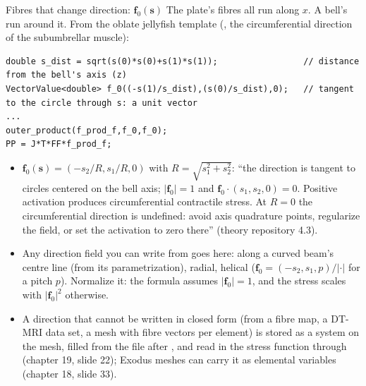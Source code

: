 \documentclass[aspectratio=169,11pt]{beamer}
\begin{document}
\begin{frame}[fragile]{Fibres that change direction: $\mathbf{f}_0(\mathbf{s})$}
\label{fr:fibres}
\footnotesize
The plate's fibres all run along $x$. A bell's run around it. From the oblate jellyfish template (, the circumferential direction of the subumbrellar muscle):
\begin{lstlisting}[style=cpptiny]
double s_dist = sqrt(s(0)*s(0)+s(1)*s(1));                 // distance from the bell's axis (z)
VectorValue<double> f_0((-s(1)/s_dist),(s(0)/s_dist),0);   // tangent to the circle through s: a unit vector
...
outer_product(f_prod_f,f_0,f_0);
PP = J*T*FF*f_prod_f;
\end{lstlisting}
\begin{itemize}
  \item $\mathbf{f}_0(\mathbf{s}) = (-s_2/R, s_1/R, 0)$ with $R = \sqrt{s_1^2 + s_2^2}$: ``the direction is tangent to circles centered on the bell axis; $|\mathbf{f}_0| = 1$ and $\mathbf{f}_0\cdot(s_1, s_2, 0) = 0$. Positive activation produces circumferential contractile stress. At $R = 0$ the circumferential direction is undefined: avoid axis quadrature points, regularize the field, or set the activation to zero there'' (theory repository 4.3).
  \item Any direction field you can write from  goes here: along a curved beam's centre line (from its parametrization), radial, helical ($\mathbf{f}_0 = (-s_2, s_1, p)/|\cdot|$ for a pitch $p$). Normalize it: the formula assumes $|\mathbf{f}_0| = 1$, and the stress scales with $|\mathbf{f}_0|^2$ otherwise.
  \item A direction that cannot be written in closed form (from a fibre map, a DT-MRI data set, a mesh with fibre vectors per element) is stored as a system on the mesh, filled from the file after , and read in the stress function through  (chapter 19, slide 22); Exodus meshes can carry it as elemental variables (chapter 18, slide 33).
\end{itemize}
\end{frame}
\end{document}
